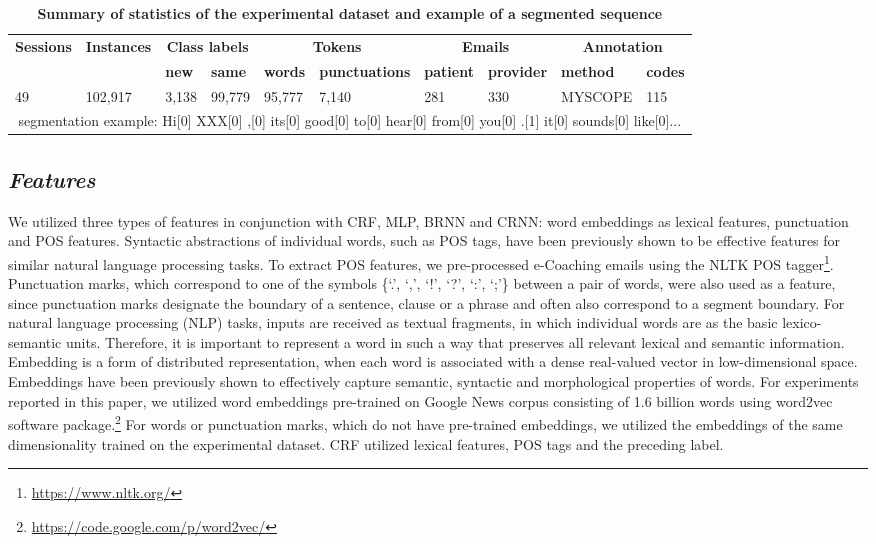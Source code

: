 \documentclass{amia}
\begin{document}
\begin{table}[ht]
\centering
\caption{\textbf{Summary of statistics of the experimental dataset and example of a segmented sequence}}
\label{tab:datastat}
 \begin{tabular}{|l|l|l|l|l|l|l|l|l|l|}
  \hline
   \multirow{2}{*}{\textbf{Sessions}} & \multirow{2}{*}{\textbf{Instances}} & \multicolumn{2}{|c|}{\textbf{Class labels}} & \multicolumn{2}{|c|}{\textbf{Tokens}} & \multicolumn{2}{|c|}{\textbf{Emails}} & \multicolumn{2}{|c|}{\textbf{Annotation}} \\\cline{3-10}
   &  & \textbf{new}  & \textbf{same} & \textbf{words} & \textbf{punctuations}  & \textbf{patient} & \textbf{provider} & \textbf{method}  & \textbf{codes} \\ \hline    
 49 & 102,917 & 3,138 & 99,779 & 95,777 & 7,140 & 281 & 330 & MYSCOPE & 115 \\ \hline
 \multicolumn{10}{|c|}{segmentation example: Hi[0] XXX[0] ,[0] its[0] good[0] to[0] hear[0] from[0] you[0] .[1] it[0] sounds[0] like[0]...} \\ \hline
  \end{tabular}
\end{table}     

\subsection*{\textit{Features}}
We utilized three types of features in conjunction with CRF, MLP, BRNN and CRNN: word embeddings as lexical features, punctuation and POS features. Syntactic abstractions of individual words, such as POS tags, have been previously shown to be effective features for similar natural language processing tasks.\cite{liu2005using,treviso2017sentence} To extract POS features, we pre-processed e-Coaching emails using the NLTK POS tagger\footnote{\url{https://www.nltk.org/}}. Punctuation marks, which correspond to one of the symbols \{`.', `,', `!', `?', `:', `;'\} between a pair of words, were also used as a feature, since punctuation marks designate the boundary of a sentence, clause or a phrase and often also correspond to a segment boundary.\cite{cho2002text} For natural language processing (NLP) tasks, inputs are received as textual fragments, in which individual words are as the basic lexico-semantic units. Therefore, it is important to represent a word in such a way that preserves all relevant lexical and semantic information. Embedding is a form of distributed representation, when each word is associated with a dense real-valued vector in low-dimensional space. Embeddings have been previously shown to effectively capture semantic, syntactic and morphological properties of words.\cite{pennington2014glove, mikolov2013distributed} For experiments reported in this paper, we utilized word embeddings pre-trained on Google News corpus consisting of 1.6 billion words using word2vec software package.\footnote{\label{fn:word2vec}\url{https://code.google.com/p/word2vec/}} For words or punctuation marks, which do not have pre-trained embeddings, we utilized the embeddings of the same dimensionality trained on the experimental dataset. CRF utilized lexical features, POS tags and the preceding label. 
\end{document}
